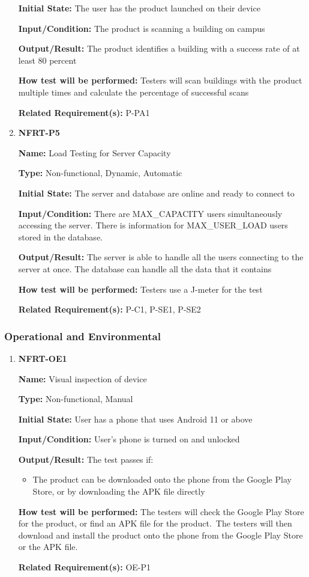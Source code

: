 \documentclass[12pt, titlepage]{article}
\begin{document}
\begin{enumerate}
\textbf{Initial State:} The user has the product launched on their device

\textbf{Input/Condition:} The product is scanning a building on campus

\textbf{Output/Result:} The product identifies a building with a success rate of at least 80 percent

\textbf{How test will be performed:} Testers will scan buildings with the product multiple times and calculate the percentage of successful scans

\textbf{Related Requirement(s):} P-PA1

\item{\textbf{NFRT-P5}}

\textbf{Name:} Load Testing for Server Capacity

\textbf{Type:} Non-functional, Dynamic, Automatic
					
\textbf{Initial State:} The server and database are online and ready to connect to

\textbf{Input/Condition:} There are MAX\_CAPACITY users simultaneously accessing the server. There is information for MAX\_USER\_LOAD users stored in the database.

\textbf{Output/Result:} The server is able to handle all the users connecting to the server at once. The database can handle all the data that it contains

\textbf{How test will be performed:} Testers use a J-meter for the test

\textbf{Related Requirement(s):} P-C1, P-SE1, P-SE2

\end{enumerate}

\subsubsection{Operational and Environmental}

\begin{enumerate}
\item{\textbf{NFRT-OE1}}

\textbf{Name:} Visual inspection of device

\textbf{Type:} Non-functional, Manual

\textbf{Initial State:} User has a phone that uses Android 11 or above

\textbf{Input/Condition:} User's phone is turned on and unlocked

\textbf{Output/Result:} The test passes if:
\begin{itemize}
  \item The product can be downloaded onto the phone from the Google Play Store, or by downloading the APK file directly
\end{itemize}

\textbf{How test will be performed:} The testers will check the Google Play Store for the product, or find an APK file for the product.\
The testers will then download and install the product onto the phone from the Google Play Store or the APK file.

\textbf{Related Requirement(s):} OE-P1

\end{enumerate}
\end{document}
